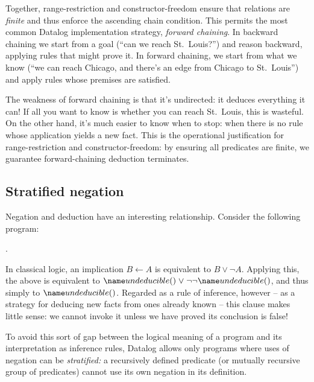 \noindent
Together, range-restriction and constructor-freedom ensure that relations are
\emph{finite} and thus enforce the ascending chain condition.
%
This permits the most common Datalog implementation strategy, \emph{forward
  chaining}.
%
In backward chaining we start from a goal (``can we reach St.~Louis?'') and
reason backward, applying rules that might prove it.
%
In forward chaining, we start from what we know (``we can reach Chicago, and
there's an edge from Chicago to St.~Louis'') and apply rules whose premises are
satisfied.

The weakness of forward chaining is that it's undirected: it deduces everything
it can! If all you want to know is whether you can reach St.~Louis, this is
wasteful. On the other hand, it's much easier to know when to stop: when there
is no rule whose application yields a new fact. This is the operational
justification for range-restriction and constructor-freedom: by ensuring all
predicates are finite, we guarantee forward-chaining deduction terminates.%
%



\subsection{Stratified negation}
\label{section-stratified-negation}

Negation and deduction have an interesting relationship.
%
Consider the following program:

\begin{datalog}
   \gets \neg {}.
\end{datalog}

\noindent
In classical logic, an implication $B \gets A$ is equivalent to $B \vee \neg A$.
Applying this, the above is equivalent to $\atom{undeducible}{} \vee
\neg\neg\atom{undeducible}{}$, and thus simply to $\atom{undeducible}{}$.
%
Regarded as a rule of inference, however -- as a strategy for deducing new facts
from ones already known -- this clause makes little sense: we cannot invoke it
unless we have proved its conclusion is false!

To avoid this sort of gap between the logical meaning of a program and its
interpretation as inference rules, Datalog allows only programs where uses of
negation can be \emph{stratified:} a recursively defined predicate (or mutually
recursive group of predicates) cannot use its own negation in its definition.

